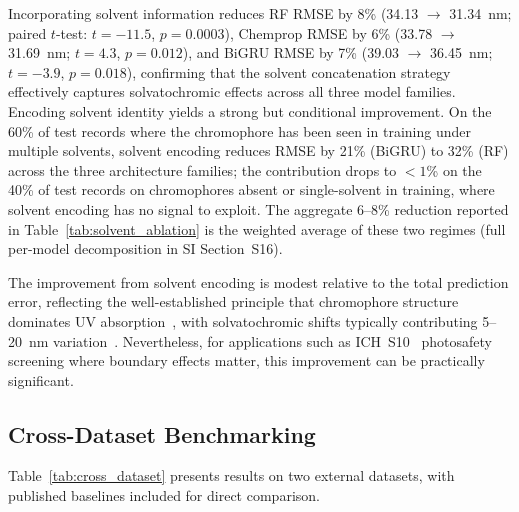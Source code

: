 \documentclass[journal=jcisd8,manuscript=article]{achemso}
\begin{document}
Incorporating solvent information reduces RF RMSE by 8\% (34.13 $\to$ 31.34~nm; paired $t$-test: $t = -11.5$, $p = 0.0003$), Chemprop RMSE by 6\% (33.78 $\to$ 31.69~nm; $t = 4.3$, $p = 0.012$), and BiGRU RMSE by 7\% (39.03 $\to$ 36.45~nm; $t = -3.9$, $p = 0.018$), confirming that the solvent concatenation strategy effectively captures solvatochromic effects across all three model families.
Encoding solvent identity yields a strong but conditional improvement. On the 60\% of test records where the chromophore has been seen in training under multiple solvents, solvent encoding reduces RMSE by 21\% (BiGRU) to 32\% (RF) across the three architecture families; the contribution drops to $<1$\% on the 40\% of test records on chromophores absent or single-solvent in training, where solvent encoding has no signal to exploit. The aggregate 6--8\% reduction reported in Table~\ref{tab:solvent_ablation} is the weighted average of these two regimes (full per-model decomposition in SI Section~S16).

The improvement from solvent encoding is modest relative to the total prediction error, reflecting the well-established principle that chromophore structure dominates UV absorption~\cite{flemingMolecular2010}, with solvatochromic shifts typically contributing 5--20~nm variation~\cite{reichardt2011solvents}.
Nevertheless, for applications such as ICH~S10~\cite{ICH2013S10} photosafety screening where boundary effects matter, this improvement can be practically significant.


\subsection{Cross-Dataset Benchmarking}
\label{sec:cross_dataset}

Table~\ref{tab:cross_dataset} presents results on two external datasets, with published baselines included for direct comparison.
\end{document}
